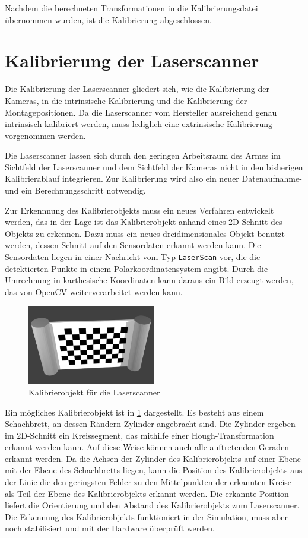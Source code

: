 Nachdem die berechneten Transformationen in die Kalibrierungsdatei übernommen 
wurden, ist die Kalibrierung abgeschlossen.


\section{Kalibrierung der Laserscanner}
\label{sec:Kalibrierung der Laserscanner}

Die Kalibrierung der Laserscanner gliedert sich, wie die Kalibrierung der 
Kameras, in die intrinsische Kalibrierung und die Kalibrierung der Montagepositionen.
Da die Laserscanner vom Hersteller ausreichend genau intrinsisch kalibriert werden,
muss lediglich eine extrinsische Kalibrierung vorgenommen werden. 

Die Laserscanner lassen sich durch den geringen Arbeitsraum des Armes im Sichtfeld 
der Laserscanner und dem Sichtfeld der
Kameras nicht in den bisherigen Kalibrierablauf integrieren. Zur Kalibrierung 
wird also ein neuer Datenaufnahme- und ein Berechnungsschritt notwendig. 

Zur Erkennnung des Kalibrierobjekts muss ein neues Verfahren entwickelt werden,
das in der Lage ist das Kalibrierobjekt anhand eines 2D-Schnitt des Objekts zu erkennen. Dazu muss
ein neues dreidimensionales Objekt benutzt werden, dessen Schnitt auf den 
Sensordaten erkannt werden kann. 
Die Sensordaten liegen in einer Nachricht vom Typ \texttt{LaserScan} vor, die 
die detektierten Punkte in einem Polarkoordinatensystem angibt. Durch die Umrechnung
in karthesische Koordinaten kann daraus ein Bild erzeugt werden, das von OpenCV
weiterverarbeitet werden kann.

\begin{figure}[htpb]
  \centering
  \includegraphics[width=0.5\textwidth]{images/laser_calibration_object}
  \caption{Kalibrierobjekt für die Laserscanner}
  \label{fig:kalibrierobjekt-laser}
\end{figure}

Ein mögliches Kalibrierobjekt ist in \ref{fig:kalibrierobjekt-laser} dargestellt.
Es besteht aus einem Schachbrett, an dessen Rändern Zylinder angebracht sind.
Die Zylinder ergeben im 2D-Schnitt ein Kreissegment, das mithilfe einer 
Hough-Transformation \cite{rohtua} erkannt werden kann. Auf diese Weise können 
auch alle 
auftretenden Geraden erkannt werden. 
Da die Achsen der 
Zylinder des Kalibrierobjekts auf einer Ebene mit der Ebene des Schachbretts liegen, kann die
Position des Kalibrierobjekts aus der Linie die den geringsten Fehler zu den
Mittelpunkten der erkannten Kreise als Teil der Ebene des Kalibrierobjekts
erkannt werden. Die erkannte Position liefert die Orientierung und den Abstand
des Kalibrierobjekts zum Laserscanner. Die Erkennung des Kalibrierobjekts
funktioniert in der Simulation, muss aber noch stabilisiert und mit der
Hardware überprüft werden.


